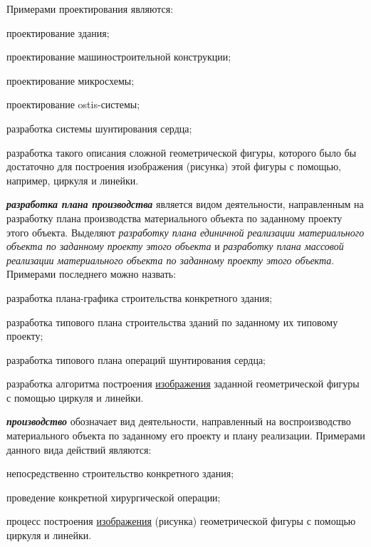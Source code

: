 Примерами проектирования являются:
\begin{textitemize}
	\item проектирование здания;
	\item проектирование машиностроительной конструкции;
	\item проектирование микросхемы;
	\item проектирование ostis-системы;
	\item разработка системы шунтирования сердца;
	\item разработка такого описания сложной геометрической фигуры, которого было бы достаточно для построения изображения (рисунка) этой фигуры с помощью, например, циркуля и линейки.
\end{textitemize}

\textbf{\textit{разработка плана производства}} является видом деятельности, направленным на разработку плана производства материального объекта по заданному проекту этого объекта. Выделяют \textit{разработку плана единичной реализации материального объекта по заданному проекту этого объекта} и \textit{разработку плана массовой реализации материального объекта по заданному проекту этого объекта}. Примерами последнего можно назвать:
\begin{textitemize}
	\item разработка плана-графика строительства конкретного здания;
	\item разработка типового плана строительства зданий по заданному их типовому проекту;
	\item разработка типового плана операций шунтирования сердца;
	\item разработка алгоритма построения \uline{изображения} заданной геометрической фигуры с помощью циркуля и линейки.
\end{textitemize}

\textbf{\textit{производство}} обозначает вид деятельности, направленный на воспроизводство материального объекта по заданному его проекту и плану реализации.
Примерами данного вида действий являются:
\begin{textitemize}
	\item непосредственно строительство конкретного здания;
	\item проведение конкретной хирургической операции;
	\item процесс построения \uline{изображения} (рисунка) геометрической фигуры с помощью циркуля и линейки.
\end{textitemize}

